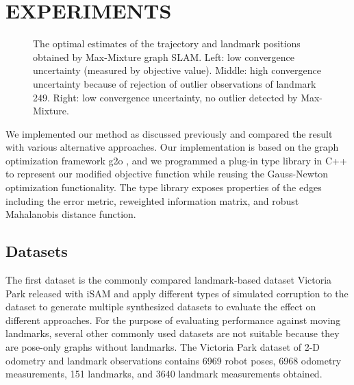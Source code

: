 \section{EXPERIMENTS}

\begin{figure}[!ht]
\caption{The optimal estimates of the trajectory and landmark positions
obtained by Max-Mixture graph SLAM.  Left: low convergence uncertainty
(measured by objective value). Middle: high convergence uncertainty because of
rejection of outlier observations of landmark 249.  Right: low convergence
uncertainty, no outlier detected by Max-Mixture.}
\label{fig:baseline}
\end{figure}

We implemented our method as discussed previously and compared the result with
various alternative approaches. Our implementation is based on the graph
optimization framework g2o \cite{g2o}, and we programmed a plug-in type library
in C++ to represent our modified objective function while reusing the Gauss-Newton
optimization functionality. The type library exposes properties of the edges including
the error metric, reweighted information matrix, and robust Mahalanobis distance function.

\subsection{Datasets}

The first dataset is the commonly compared landmark-based dataset Victoria Park released with iSAM
\cite{isam} and apply different types of simulated corruption to the dataset to
generate multiple synthesized datasets to evaluate the effect on different
approaches.  For the purpose of evaluating performance against moving
landmarks, several other commonly used datasets are not suitable because they
are pose-only graphs without landmarks. The Victoria Park dataset of 2-D
odometry and landmark observations contains 6969 robot poses, 6968 odometry
measurements, 151 landmarks, and 3640 landmark measurements obtained.

